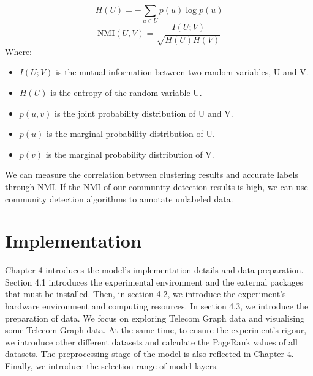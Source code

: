 \documentclass[ %
                    author={Tengyao Tu},
                supervisor={Dr. James Pope},
                    degree={MSc},
                     title={A New Perspective on Graph Community Detection: Combining Traditional Methods with Deep Learning Approaches},
                  subtitle={Applying to Telecom Networks and Diverse Datasets},
                      type={},
                      year={2024}]{dissertation}
\begin{document}
\begin{equation}
H(U) = - \sum_{u \in U} p(u) \log p(u)
\label{eq:H(U)}
\end{equation}
\begin{equation}
\text{NMI}(U, V) = \frac{I(U; V)}{\sqrt{H(U) H(V)}}
\label{eq: NMI(U,V)}
\end{equation}
Where:
\begin{itemize}
    \item $I(U; V)$ is the mutual information between two random variables, U and V.
    \item $H(U)$ is the entropy of the random variable U.
    \item $p(u, v)$ is the joint probability distribution of U and V.
    \item $p(u)$ is the marginal probability distribution of U.
    \item $p(v)$ is the marginal probability distribution of V.
\end{itemize}
We can measure the correlation between clustering results and accurate labels through NMI. If the NMI of our community detection results is high, we can use community detection algorithms to annotate unlabeled data.
\chapter{Implementation}
\label{chap:Implementation}
Chapter 4 introduces the model's implementation details and data preparation. Section 4.1 introduces the experimental environment and the external packages that must be installed. Then, in section 4.2, we introduce the experiment's hardware environment and computing resources. In section 4.3, we introduce the preparation of data. We focus on exploring Telecom Graph data and visualising some Telecom Graph data. At the same time, to ensure the experiment's rigour, we introduce other different datasets and calculate the PageRank values of all datasets. The preprocessing stage of the model is also reflected in Chapter 4. Finally, we introduce the selection range of model layers.
\end{document}
